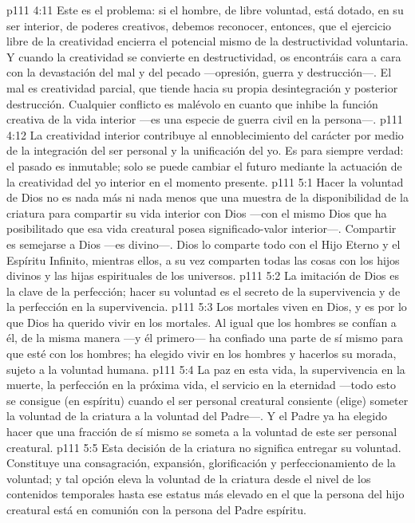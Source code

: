 \vs p111 4:11 Este es el problema: si el hombre, de libre voluntad, está dotado, en su ser interior, de poderes creativos, debemos reconocer, entonces, que el ejercicio libre de la creatividad encierra el potencial mismo de la destructividad voluntaria. Y cuando la creatividad se convierte en destructividad, os encontráis cara a cara con la devastación del mal y del pecado ---opresión, guerra y destrucción---. El mal es creatividad parcial, que tiende hacia su propia desintegración y posterior destrucción. Cualquier conflicto es malévolo en cuanto que inhibe la función creativa de la vida interior ---es una especie de guerra civil en la persona---.
\vs p111 4:12 \pc La creatividad interior contribuye al ennoblecimiento del carácter por medio de la integración del ser personal y la unificación del yo. Es para siempre verdad: el pasado es inmutable; solo se puede cambiar el futuro mediante la actuación de la creatividad del yo interior en el momento presente.
\vs p111 5:1 Hacer la voluntad de Dios no es nada más ni nada menos que una muestra de la disponibilidad de la criatura para compartir su vida interior con Dios ---con el mismo Dios que ha posibilitado que esa vida creatural posea significado\hyp{}valor interior---. Compartir es semejarse a Dios ---es divino---. Dios lo comparte todo con el Hijo Eterno y el Espíritu Infinito, mientras ellos, a su vez comparten todas las cosas con los hijos divinos y las hijas espirituales de los universos.
\vs p111 5:2 La imitación de Dios es la clave de la perfección; hacer su voluntad es el secreto de la supervivencia y de la perfección en la supervivencia.
\vs p111 5:3 Los mortales viven en Dios, y es por lo que Dios ha querido vivir en los mortales. Al igual que los hombres se confían a él, de la misma manera ---y él primero--- ha confiado una parte de sí mismo para que esté con los hombres; ha elegido vivir en los hombres y hacerlos su morada, sujeto a la voluntad humana.
\vs p111 5:4 La paz en esta vida, la supervivencia en la muerte, la perfección en la próxima vida, el servicio en la eternidad ---todo esto se consigue  (en espíritu) cuando el ser personal creatural consiente (elige) someter la voluntad de la criatura a la voluntad del Padre---. Y el Padre ya ha elegido hacer que una fracción de sí mismo se someta a la voluntad de este ser personal creatural.
\vs p111 5:5 Esta decisión de la criatura no significa entregar su voluntad. Constituye una consagración, expansión, glorificación y perfeccionamiento de la voluntad; y tal opción eleva la voluntad de la criatura desde el nivel de los contenidos temporales hasta ese estatus más elevado en el que la persona del hijo creatural está en comunión con la persona del Padre espíritu.
